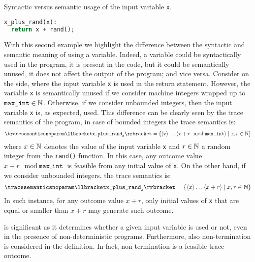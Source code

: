 \begin{example}
  \begin{marginlisting}
    \caption{Syntactic versus semantic usage of the input variable \texttt{x}.}
    \vspace{2\lineheight}
  \begin{lstlisting}[language=Python]
x_plus_rand(x):
  return x + rand();
\end{lstlisting}
  \end{marginlisting}
With this second example we highlight the difference between the syntactic and semantic meaning of using a variable. Indeed, a variable could be syntactically used in the program, \ie it is present in the code, but it could be semantically unused, \ie it does not affect the output of the program; and vice versa.
Consider  on the side, where the input variable \texttt{x} is used in the return statement.
However, the variable \texttt{x} is semantically unused if we consider machine integers wrapped up to $\texttt{max\_int}\in\mathbb{N}$. Otherwise, if we consider unbounded integers, then the input variable \texttt{x} is, as expected, used.
This difference can be clearly seen by the trace semantics of the program, in case of bounded integers the trace semantics is:
\begin{align*}
  \tracesemanticsnoparam\semanticsof{\texttt{x\_plus\_rand}_\texttt{x}}
  =
  \setdef{
    \langle{x}\rangle\dots\langle{x+r \mod \texttt{max\_int}}\rangle
  }{x, r \in \N}
\end{align*}
where $x\in\mathbb{N}$ denotes the value of the input variable \texttt{x} and $r\in\mathbb{N}$ a random integer from the \texttt{rand()} function.
In this case, any outcome value $x+r \mod \texttt{max\_int}$ is feasible from any initial value of \texttt{x}.
On the other hand, if we consider unbounded integers, the trace semantics is:
\begin{align*}
  \tracesemanticsnoparam\semanticsof{\texttt{x\_plus\_rand}_\texttt{x}}
  =
  \setdef{
    \langle{x}\rangle\dots\langle{x+r}\rangle
  }{x, r \in \N}
\end{align*}
In such instance, for any outcome value $x+r$, only initial values of \texttt{x} that are equal or smaller than $x+r$ may generate such outcome.
\end{example}

 is significant as it determines whether a given input variable is used or not, even in the presence of non-deterministic programs.
Furthermore, also non-termination is considered in the definition.
In fact, non-termination is a feasible trace outcome.

